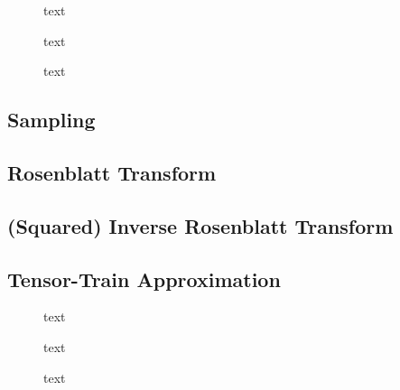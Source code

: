 \begin{figure}[h]
	\centering
	\scalebox{0.66}{}
	\caption[]{text}
	\label{fig:Results}
\end{figure}


\begin{figure}[h]
	\centering
	\scalebox{0.66}{}
	\caption[]{text}
	\label{fig:Results}
\end{figure}


\begin{figure}[h]
	\centering
	\scalebox{0.66}{}
	\caption[]{text}
	\label{fig:Results}
\end{figure}



\subsection{Sampling}

\subsection{ Rosenblatt Transform}
\subsection{(Squared) Inverse Rosenblatt Transform}
\subsection{Tensor-Train Approximation}

\begin{figure}[h]
	\centering
	\scalebox{0.66}{}
	\caption[]{text}
	\label{fig:Results}
\end{figure}
\begin{figure}[h]
	\centering
	\scalebox{0.66}{}
	\caption[]{text}
	\label{fig:Results}
\end{figure}

\begin{figure}[h]
	\centering
	\scalebox{0.66}{}
	\caption[]{text}
	\label{fig:Results}
\end{figure}



